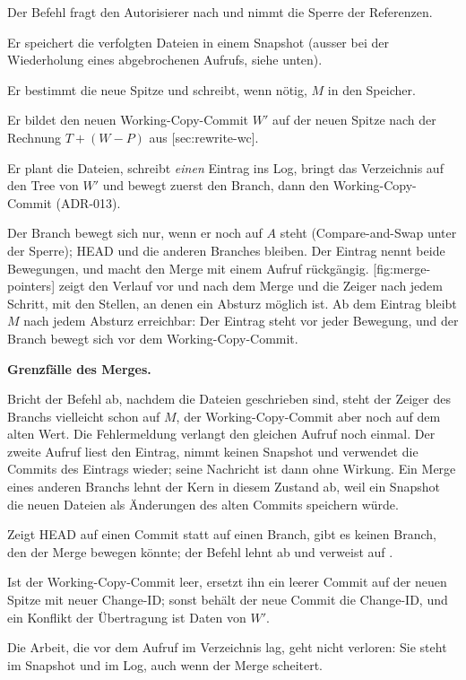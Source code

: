 \startitemize[n]
\item Der Befehl fragt den Autorisierer nach  und nimmt die Sperre der Referenzen.
\item Er speichert die verfolgten Dateien in einem Snapshot
(ausser bei der Wiederholung eines abgebrochenen Aufrufs, siehe unten).
\item Er bestimmt die neue Spitze und schreibt, wenn nötig, $M$ in den Speicher.
\item Er bildet den neuen Working-Copy-Commit $W'$ auf der neuen Spitze nach der Rechnung
$T + (W - P)$ aus [sec:rewrite-wc].
\item Er plant die Dateien, schreibt \emph{einen} Eintrag ins Log, bringt das Verzeichnis auf den
Tree von $W'$ und bewegt zuerst den Branch, dann den Working-Copy-Commit (ADR-013).
\stopitemize

Der Branch bewegt sich nur, wenn er noch auf $A$ steht (Compare-and-Swap unter der Sperre);
HEAD und die anderen Branches bleiben.
Der Eintrag  nennt beide Bewegungen, und  macht den Merge mit
einem Aufruf rückgängig.
[fig:merge-pointers] zeigt den Verlauf vor und nach dem Merge
und die Zeiger nach jedem Schritt, mit den Stellen, an denen ein Absturz möglich ist.
Ab dem Eintrag bleibt $M$ nach jedem Absturz erreichbar:
Der Eintrag steht vor jeder Bewegung, und der Branch bewegt sich vor dem Working-Copy-Commit.

\startplacefigure[title={Verlauf und Zeiger beim Merge von \type{feature} in \type{main}, mit den
    Zuständen nach einem Absturz},
    reference=fig:merge-pointers,location=here]
\stopplacefigure

\startinfobox
{\bf Grenzfälle des Merges.}
\startitemize
\item Bricht der Befehl ab, nachdem die Dateien geschrieben sind, steht der Zeiger des Branchs
vielleicht schon auf $M$, der Working-Copy-Commit aber noch auf dem alten Wert.
Die Fehlermeldung verlangt den gleichen Aufruf noch einmal.
Der zweite Aufruf liest den Eintrag, nimmt keinen Snapshot und verwendet die Commits des Eintrags
wieder; seine Nachricht ist dann ohne Wirkung.
Ein Merge eines anderen Branchs lehnt der Kern in diesem Zustand ab, weil ein Snapshot die neuen
Dateien als Änderungen des alten Commits speichern würde.
\item Zeigt HEAD auf einen Commit statt auf einen Branch, gibt es keinen Branch, den der Merge
bewegen könnte; der Befehl lehnt ab und verweist auf .
\item Ist der Working-Copy-Commit leer, ersetzt ihn ein leerer Commit auf der neuen Spitze mit
neuer Change-ID; sonst behält der neue Commit die Change-ID, und ein Konflikt der Übertragung ist
Daten von $W'$.
\item Die Arbeit, die vor dem Aufruf im Verzeichnis lag, geht nicht verloren:
Sie steht im Snapshot und im Log, auch wenn der Merge scheitert.
\stopitemize
\stopinfobox

